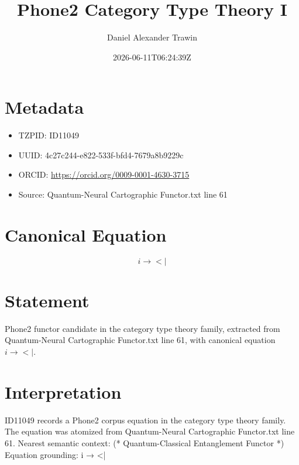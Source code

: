 \documentclass[11pt]{article}
\title{Phone2 Category Type Theory I}
\author{Daniel Alexander Trawin}
\date{2026-06-11T06:24:39Z}
\begin{document}
\maketitle
\section*{Metadata}
\begin{itemize}
\item TZPID: ID11049
\item UUID: 4c27c244-e822-533f-bfd4-7679a8b9229c
\item ORCID: \url{https://orcid.org/0009-0001-4630-3715}
\item Source: Quantum-Neural Cartographic Functor.txt line 61
\end{itemize}
\section*{Canonical Equation}
\[
i → <|
\]
\section*{Statement}
Phone2 functor candidate in the category type theory family, extracted from Quantum-Neural Cartographic Functor.txt line 61, with canonical equation $i → <|$.
\section*{Interpretation}
ID11049 records a Phone2 corpus equation in the category type theory family. The equation was atomized from Quantum-Neural Cartographic Functor.txt line 61. Nearest semantic context: (* Quantum-Classical Entanglement Functor *) Equation grounding: i → <|
\end{document}
